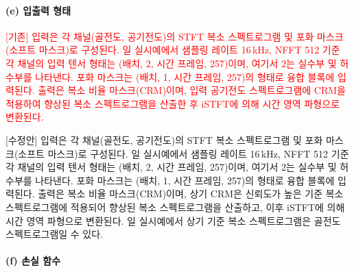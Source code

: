 \documentclass{article}
\newcommand{\reviewold}[1]{{\par\noindent\textcolor{red}{[기존] #1}}}
\newcommand{\reviewnew}[1]{{\par\noindent\textcolor{customblue}{[수정안] #1}}}
\newcommand{\reviewpair}[2]{\reviewold{#1}\reviewnew{#2}\par}
\begin{document}
\paragraph{(e) 입출력 형태}

\reviewpair{입력은 각 채널(골전도, 공기전도)의 STFT 복소 스펙트로그램 및 포화 마스크(소프트 마스크)로 구성된다. 일 실시예에서 샘플링 레이트 16\,kHz, NFFT 512 기준 각 채널의 입력 텐서 형태는 (배치, 2, 시간 프레임, 257)이며, 여기서 2는 실수부 및 허수부를 나타낸다. 포화 마스크는 (배치, 1, 시간 프레임, 257)의 형태로 융합 블록에 입력된다. 출력은 복소 비율 마스크(CRM)이며, 입력 공기전도 스펙트로그램에 CRM을 적용하여 향상된 복소 스펙트로그램을 산출한 후 iSTFT에 의해 시간 영역 파형으로 변환된다.}{입력은 각 채널(골전도, 공기전도)의 STFT 복소 스펙트로그램 및 포화 마스크(소프트 마스크)로 구성된다. 일 실시예에서 샘플링 레이트 16\,kHz, NFFT 512 기준 각 채널의 입력 텐서 형태는 (배치, 2, 시간 프레임, 257)이며, 여기서 2는 실수부 및 허수부를 나타낸다. 포화 마스크는 (배치, 1, 시간 프레임, 257)의 형태로 융합 블록에 입력된다. 출력은 복소 비율 마스크(CRM)이며, 상기 CRM은 신뢰도가 높은 기준 복소 스펙트로그램에 적용되어 향상된 복소 스펙트로그램을 산출하고, 이후 iSTFT에 의해 시간 영역 파형으로 변환된다. 일 실시예에서 상기 기준 복소 스펙트로그램은 골전도 스펙트로그램일 수 있다.}

\paragraph{(f) 손실 함수}
\end{document}
